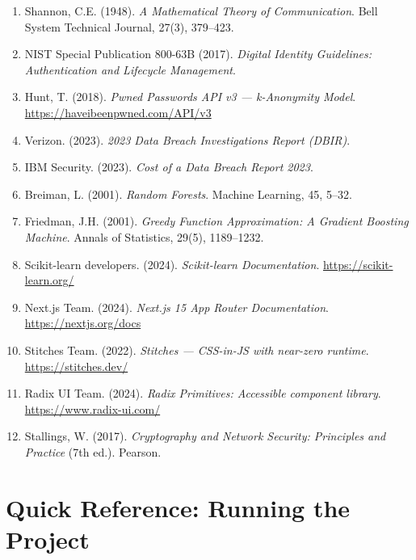 \documentclass[12pt,a4paper]{article}
\begin{document}
\begin{enumerate}
    \item Shannon, C.E. (1948). \textit{A Mathematical Theory of Communication}.
    Bell System Technical Journal, 27(3), 379–423.

    \item NIST Special Publication 800-63B (2017). \textit{Digital Identity
    Guidelines: Authentication and Lifecycle Management}.

    \item Hunt, T. (2018). \textit{Pwned Passwords API v3 — k-Anonymity Model}.
    \url{https://haveibeenpwned.com/API/v3}

    \item Verizon. (2023). \textit{2023 Data Breach Investigations Report (DBIR)}.

    \item IBM Security. (2023). \textit{Cost of a Data Breach Report 2023}.

    \item Breiman, L. (2001). \textit{Random Forests}. Machine Learning, 45, 5–32.

    \item Friedman, J.H. (2001). \textit{Greedy Function Approximation: A Gradient
    Boosting Machine}. Annals of Statistics, 29(5), 1189–1232.

    \item Scikit-learn developers. (2024). \textit{Scikit-learn Documentation}.
    \url{https://scikit-learn.org/}

    \item Next.js Team. (2024). \textit{Next.js 15 App Router Documentation}.
    \url{https://nextjs.org/docs}

    \item Stitches Team. (2022). \textit{Stitches --- CSS-in-JS with near-zero runtime}.
    \url{https://stitches.dev/}

    \item Radix UI Team. (2024). \textit{Radix Primitives: Accessible component library}.
    \url{https://www.radix-ui.com/}

    \item Stallings, W. (2017). \textit{Cryptography and Network Security:
    Principles and Practice} (7th ed.). Pearson.
\end{enumerate}

\appendix
\section{Quick Reference: Running the Project}
\end{document}
